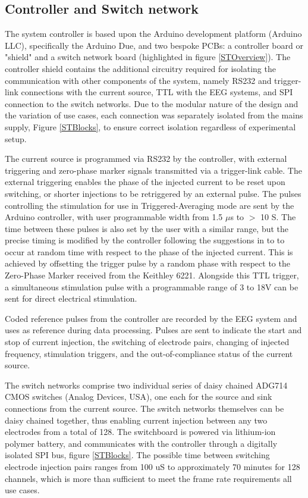 \subsection{Controller and Switch network}

The system controller is based upon the Arduino development platform (Arduino LLC), specifically the Arduino Due, and two bespoke PCBs: a controller board or "shield" and a switch network board (highlighted in figure \ref{STOverview}). The controller shield contains the additional circuitry required for isolating the communication with other components of the system, namely RS232 and trigger-link connections with the current source, TTL with the EEG systems, and SPI connection to the switch networks. Due to the modular nature of the design and the variation of use cases, each connection was separately isolated from the mains supply, Figure \ref{STBlocks}, to ensure correct isolation regardless of experimental setup.

The current source is programmed via RS232 by the controller, with external triggering and zero-phase marker signals transmitted via a trigger-link cable. The external triggering enables the phase of the injected current to be reset upon switching, or shorter injections to be retriggered by an external pulse. The pulses controlling the stimulation for use in Triggered-Averaging mode are sent by the Arduino controller, with user programmable width from 1.5 $\mu$s to $>$ 10 S. The time between these pulses is also set by the user with a similar range, but the precise timing is modified by the controller following the suggestions in \cite{Aristovich_2015} to to occur at random time with respect to the phase of the injected current. This is achieved by offsetting the trigger pulse by a random phase with respect to the Zero-Phase Marker received from the Keithley 6221. Alongside this TTL trigger, a simultaneous stimulation pulse with a programmable range of 3 to 18V can be sent for direct electrical stimulation.

Coded reference pulses from the controller are recorded by the EEG system and uses as reference during data processing. Pulses are sent to indicate the start and stop of current injection, the switching of electrode pairs, changing of injected frequency, stimulation triggers, and the out-of-compliance status of the current source. 

The switch networks comprise two individual series of daisy chained ADG714 CMOS switches (Analog Devices, USA), one each for the source and sink connections from the current source. The switch networks themselves can be daisy chained together, thus enabling current injection between any two electrodes from a total of 128. The switchboard is powered via lithium-ion polymer battery, and communicates with the controller through a digitally isolated SPI bus, figure \ref{STBlocks}. The possible time between switching electrode injection pairs ranges from 100 uS to approximately 70 minutes for 128 channels, which is more than sufficient to meet the frame rate requirements all use cases. 